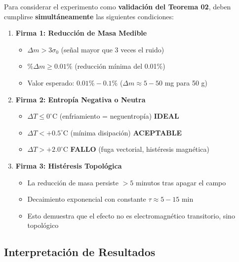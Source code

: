 \documentclass[12pt, a4paper]{article}
\begin{document}
\begin{tcolorbox}[
    colback=gemgold!10,
    colframe=gemgold,
    title=\textbf{\textcolor{gemdark}{LAS 3 FIRMAS DEL ÉXITO (CRITERIOS DE VALIDACIÓN)}},
    fonttitle=\bfseries\large,
    boxrule=1.5pt,
    arc=4pt
]
Para considerar el experimento como \textbf{validación del Teorema 02}, deben cumplirse \textbf{simultáneamente} las siguientes condiciones:

\begin{enumerate}
    \item \textbf{Firma 1: Reducción de Masa Medible}
    \begin{itemize}
        \item $\Delta m > 3\sigma_0$ (señal mayor que 3 veces el ruido)
        \item $\% \Delta m \geq 0.01\%$ (reducción mínima del 0.01\%)
        \item Valor esperado: $0.01\% - 0.1\%$ ($\Delta m \approx 5-50$ mg para 50 g)
    \end{itemize}
    
    \item \textbf{Firma 2: Entropía Negativa o Neutra}
    \begin{itemize}
        \item $\Delta T \leq 0^\circ$C (enfriamiento = neguentropía) \textbf{IDEAL}
        \item $\Delta T < +0.5^\circ$C (mínima disipación) \textbf{ACEPTABLE}
        \item $\Delta T > +2.0^\circ$C \textbf{FALLO} (fuga vectorial, histéresis magnética)
    \end{itemize}
    
    \item \textbf{Firma 3: Histéresis Topológica}
    \begin{itemize}
        \item La reducción de masa persiste $> 5$ minutos tras apagar el campo
        \item Decaimiento exponencial con constante $\tau \approx 5-15$ min
        \item Esto demuestra que el efecto no es electromagnético transitorio, sino topológico
    \end{itemize}
\end{enumerate}
\end{tcolorbox}

\subsection{Interpretación de Resultados}
\end{document}
